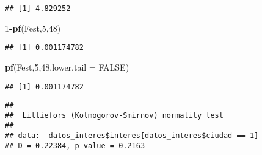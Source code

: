 \documentclass[
]{article}
\newenvironment{Shaded}{\begin{snugshade}}{\end{snugshade}}
\newcommand{\CommentTok}[1]{\textcolor[rgb]{0.56,0.35,0.01}{\textit{#1}}}
\newcommand{\DataTypeTok}[1]{\textcolor[rgb]{0.13,0.29,0.53}{#1}}
\newcommand{\DecValTok}[1]{\textcolor[rgb]{0.00,0.00,0.81}{#1}}
\newcommand{\KeywordTok}[1]{\textcolor[rgb]{0.13,0.29,0.53}{\textbf{#1}}}
\newcommand{\NormalTok}[1]{#1}
\newcommand{\OperatorTok}[1]{\textcolor[rgb]{0.81,0.36,0.00}{\textbf{#1}}}
\newcommand{\OtherTok}[1]{\textcolor[rgb]{0.56,0.35,0.01}{#1}}
\begin{document}
\begin{verbatim}
## [1] 4.829252
\end{verbatim}

\begin{Shaded}
\begin{Highlighting}[]
\DecValTok{1}\OperatorTok{-}\KeywordTok{pf}\NormalTok{(Fest,}\DecValTok{5}\NormalTok{,}\DecValTok{48}\NormalTok{)}
\end{Highlighting}
\end{Shaded}

\begin{verbatim}
## [1] 0.001174782
\end{verbatim}

\begin{Shaded}
\begin{Highlighting}[]
\KeywordTok{pf}\NormalTok{(Fest,}\DecValTok{5}\NormalTok{,}\DecValTok{48}\NormalTok{,}\DataTypeTok{lower.tail =} \OtherTok{FALSE}\NormalTok{)}
\end{Highlighting}
\end{Shaded}

\begin{verbatim}
## [1] 0.001174782
\end{verbatim}

\begin{Shaded}
\end{Shaded}

\begin{verbatim}
## 
##  Lilliefors (Kolmogorov-Smirnov) normality test
## 
## data:  datos_interes$interes[datos_interes$ciudad == 1]
## D = 0.22384, p-value = 0.2163
\end{verbatim}

\begin{Shaded}
\end{Shaded}
\end{document}
